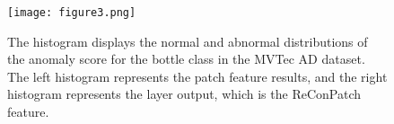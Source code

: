 \documentclass[10pt,onecolumn,letterpaper]{article}
\begin{document}
\begin{table}[]
\caption{Comparison of ensemble model anomaly detection (Image-level AUROC) and segmentation (Pixel-level AUROC) performance. The {\color{gray}gray} color indicates the use of a different image size compared to previous studies.}
\label{table:6}
\end{table}


\begin{figure}
\begin{center}
\texttt{[image: figure3.png]}
\end{center}
\caption{The histogram displays the normal and abnormal distributions of the anomaly score for the bottle class in the MVTec AD \cite{bergmann2019mvtec} dataset. The left histogram represents the patch feature results, and the right histogram represents the  layer output, which is the ReConPatch feature.}
\label{fig:3}
\end{figure}
\end{document}
